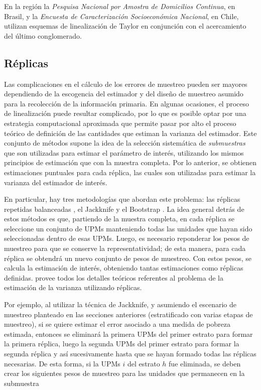 En la región la \emph{Pesquisa Nacional por Amostra de Domicilios Continua}, en Brasil, y la \emph{Encuesta de Caracterización Socioeconómica Nacional}, en Chile, utilizan esquemas de linealización de Taylor en conjunción con el acercamiento del último conglomerado.

\hypertarget{replicas}{%
\subsection{Réplicas}\label{replicas}}

Las complicaciones en el cálculo de los errores de muestreo pueden ser mayores dependiendo de la escogencia del estimador y del diseño de muestreo asumido para la recolección de la información primaria. En algunas ocasiones, el proceso de linealización puede resultar complicado, por lo que es posible optar por una estrategia computacional aproximada que permite pasar por alto el proceso teórico de definición de las cantidades que estiman la varianza del estimador. Este conjunto de métodos supone la idea de la selección sistemática de \emph{submuestras} que son utilizadas para estimar el parámetro de interés, utilizando los mismos principios de estimación que con la muestra completa. Por lo anterior, se obtienen estimaciones puntuales para cada réplica, las cuales son utilizadas para estimar la varianza del estimador de interés.

En particular, hay tres metodologías que abordan este problema: las réplicas repetidas balanceadas \citep{McCarthy_1969, Judkins_1990}, el Jackknife \citep{Krewski_Rao_1981} y el Bootstrap \citep{Rao_Wu_1988}. La idea general detrás de estos métodos es que, partiendo de la muestra completa, en cada réplica se seleccione un conjunto de UPMs manteniendo todas las unidades que hayan sido seleccionadas dentro de esas UPMs. Luego, es necesario reponderar los pesos de muestreo para que se conserve la representatividad; de esta manera, para cada réplica se obtendrá un nuevo conjunto de pesos de muestreo. Con estos pesos, se calcula la estimación de interés, obteniendo tantas estimaciones como réplicas definidas. \citet{Wolter_2007} provee todos los detalles teóricos referentes al problema de la estimación de la varianza utilizando réplicas.

Por ejemplo, al utilizar la técnica de Jackknife, y asumiendo el escenario de muestreo planteado en las secciones anteriores (estratificado con varias etapas de muestreo), si se quiere estimar el error asociado a una medida de pobreza estimada, entonces se eliminará la primera UPMs del primer estrato para formar la primera réplica, luego la segunda UPMs del primer estrato para formar la segunda réplica y así sucesivamente hasta que se hayan formado todas las réplicas necesarias. De esta forma, si la UPMs \(i\) del estrato \(h\) fue eliminada, se deben crear los siguientes pesos de muestreo para las unidades que permanecen en la submuestra

